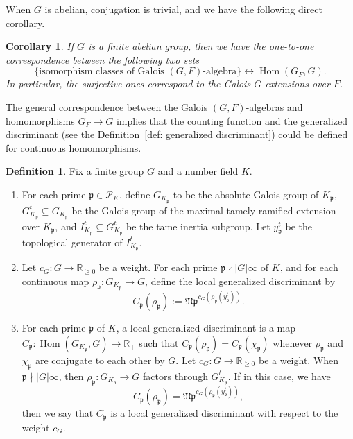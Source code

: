 \documentclass[12pt,a4paper]{amsart}
\numberwithin{equation}{section}%
\theoremstyle{plain}%
\newtheorem{corollary}[theorem]{Corollary}%
\theoremstyle{definition}%
\newtheorem{definition}[theorem]{Definition}%
\theoremstyle{remark}%
\begin{document}
	When $G$ is abelian, conjugation is trivial, and we have the following direct corollary.
	\begin{corollary}
		If $G$ is a finite abelian group, then we have the one-to-one correspondence between the following two sets
		\begin{equation*}
			\{\text{isomorphism classes of Galois }(G,F)\text{-algebra}\}\leftrightarrow\operatorname{Hom}(G_F,G).
		\end{equation*}
		In particular, the surjective ones correspond to the Galois $G$-extensions over $F$.
	\end{corollary}
	The general correspondence between the Galois $(G,F)$-algebras and homomorphisms $G_F\to G$ implies that the counting function and the generalized discriminant (see the Definition~\ref{def: generalized discriminant}) could be defined for continuous homomorphisms.
	\begin{definition}\label{def: generalized discriminant of morphisms}
		Fix a finite group $G$ and a number field $K$.
		\begin{enumerate}
			\item For each prime $\mathfrak{p}\in\mathcal{P}_K$, 
			define $G_{K_{\mathfrak{p}}}$ to be the absolute Galois group of $K_{\mathfrak{p}}$, 
			$G_{K_{\mathfrak{p}}}^t\subseteq G_{K_{\mathfrak{p}}}$ be the Galois group of the maximal tamely ramified extension over $K_{\mathfrak{p}}$, 
			and $I_{K_{\mathfrak{p}}}^t\subseteq G_{K_{\mathfrak{p}}}^{t}$ be the tame inertia subgroup.
			Let $y_{\mathfrak{p}}^{t}$ be the topological generator of $I_{K_{\mathfrak{p}}}^{t}$.
			\item Let $c_G:G\to\mathbb{R}_{\geq0}$ be a weight.
			For each prime $\mathfrak{p}\nmid\lvert G\rvert\infty$ of $K$, and for each continuous map $\rho_{\mathfrak{p}}:G_{K_{\mathfrak{p}}}\to G$, define the local generalized discriminant by
			\begin{equation*}
				C_{\mathfrak{p}}(\rho_{\mathfrak{p}}):=\mathfrak{Np}^{c_G(\rho_{\mathfrak{p}}(y_{\mathfrak{p}}^{t}))}.
			\end{equation*}
			\item For each prime $\mathfrak{p}$ of $K$, a local generalized discriminant is a map $C_{\mathfrak{p}}:\operatorname{Hom}(G_{K_{\mathfrak{p}}},G)\to\mathbb{R}_{+}$ such that $C_{\mathfrak{p}}(\rho_{\mathfrak{p}})=C_{\mathfrak{p}}(\chi_{\mathfrak{p}})$ whenever $\rho_{\mathfrak{p}}$ and $\chi_{\mathfrak{p}}$ are conjugate to each other by $G$.
			Let $c_{G}:G\to\mathbb{R}_{\geq 0}$ be a weight.
			When $\mathfrak{p}\nmid\lvert G\rvert\infty$, then $\rho_{\mathfrak{p}}:G_{K_{\mathfrak{p}}}\to G$ factors through $G_{K_{\mathfrak{p}}}^t$.
			If in this case, we have
			\begin{equation*}
				C_{\mathfrak{p}}(\rho_{\mathfrak{p}})=\mathfrak{Np}^{c_G(\rho_{\mathfrak{p}}(y_{\mathfrak{p}}^{t}))},
			\end{equation*}
			then we say that $C_{\mathfrak{p}}$ is a local generalized discriminant with respect to the weight $c_{G}$.
		\end{enumerate}		
	\end{definition}
\end{document}
